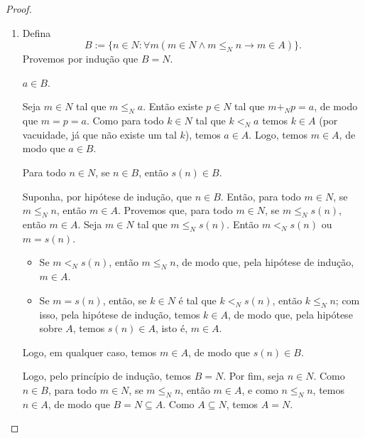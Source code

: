 \begin{proof}
    \leavevmode
        \begin{enumerate}[leftmargin=*, align=left, label=\textbf{(\alph*)}]
            \item Defina
                \[
                    B := \{n \in N : \forall m (m \in N \land m \leq_N n \rightarrow m \in A)\}.
                \]
            Provemos por indução que $B = N$.
                \begin{claim}
                    $a \in B$.
                \end{claim}
                \begin{midproof}
                    Seja $m \in N$ tal que $m \leq_N a$. Então existe $p \in N$ tal que $m +_N p = a$, de modo que $m = p = a$. Como para todo $k \in N$ tal que $k <_N a$ temos $k \in A$ (por vacuidade, já que não existe um tal $k$), temos $a \in A$. Logo, temos $m \in A$, de modo que $a \in B$. \whiteproof
                \end{midproof}
                \begin{claim}
                    Para todo $n \in N$, se $n \in B$, então $s(n) \in B$.
                \end{claim}
                \begin{midproof}
                    Suponha, por hipótese de indução, que $n \in B$. Então, para todo $m \in N$, se $m \leq_N n$, então $m \in A$. Provemos que, para todo $m \in N$, se $m \leq_N s(n)$, então $m \in A$. Seja $m \in N$ tal que $m \leq_N s(n)$. Então $m <_N s(n)$ ou $m = s(n)$.
                        \begin{itemize}
                            \item Se $m <_N s(n)$, então $m \leq_N n$, de modo que, pela hipótese de indução, $m \in A$.
                            \item Se $m = s(n)$, então, se $k \in N$ é tal que $k <_N s(n)$, então $k \leq_N n$; com isso, pela hipótese de indução, temos $k \in A$, de modo que, pela hipótese sobre $A$, temos $s(n) \in A$, isto é, $m \in A$.
                        \end{itemize}
                    Logo, em qualquer caso, temos $m \in A$, de modo que $s(n) \in B$. \whiteproof
                \end{midproof}
            Logo, pelo princípio de indução, temos $B = N$. Por fim, seja $n \in N$. Como $n \in B$, para todo $m \in N$, se $m \leq_N n$, então $m \in A$, e como $n \leq_N n$, temos $n \in A$, de modo que $B = N \subseteq A$. Como $A \subseteq N$, temos $A = N$. \blackproof

\end{enumerate}
\end{proof}
